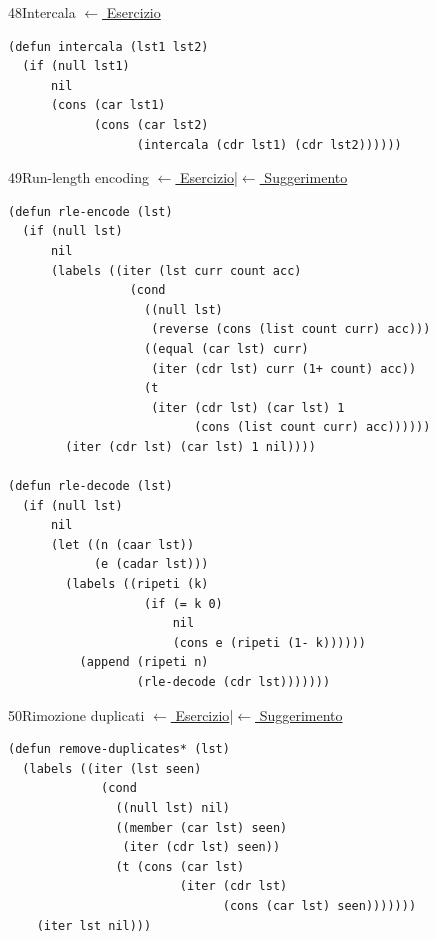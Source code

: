\label{sol:48}
\begin{solbox}{48}{Intercala}
\small\color{black!55}\hyperref[ex:48]{$\leftarrow$ Esercizio}\normalsize\color{black}
\begin{lstlisting}
(defun intercala (lst1 lst2)
  (if (null lst1)
      nil
      (cons (car lst1)
            (cons (car lst2)
                  (intercala (cdr lst1) (cdr lst2))))))
\end{lstlisting}
\end{solbox}

\label{sol:49}
\begin{solbox}{49}{Run-length encoding}
\small\color{black!55}\hyperref[ex:49]{$\leftarrow$ Esercizio}\enspace\textcolor{black!30}{|}\enspace\hyperref[hint:49]{$\leftarrow$ Suggerimento}\normalsize\color{black}
\begin{lstlisting}
(defun rle-encode (lst)
  (if (null lst)
      nil
      (labels ((iter (lst curr count acc)
                 (cond
                   ((null lst)
                    (reverse (cons (list count curr) acc)))
                   ((equal (car lst) curr)
                    (iter (cdr lst) curr (1+ count) acc))
                   (t
                    (iter (cdr lst) (car lst) 1
                          (cons (list count curr) acc))))))
        (iter (cdr lst) (car lst) 1 nil))))

(defun rle-decode (lst)
  (if (null lst)
      nil
      (let ((n (caar lst))
            (e (cadar lst)))
        (labels ((ripeti (k)
                   (if (= k 0)
                       nil
                       (cons e (ripeti (1- k))))))
          (append (ripeti n)
                  (rle-decode (cdr lst)))))))
\end{lstlisting}
\end{solbox}

\label{sol:50}
\begin{solbox}{50}{Rimozione duplicati}
\small\color{black!55}\hyperref[ex:50]{$\leftarrow$ Esercizio}\enspace\textcolor{black!30}{|}\enspace\hyperref[hint:50]{$\leftarrow$ Suggerimento}\normalsize\color{black}
\begin{lstlisting}
(defun remove-duplicates* (lst)
  (labels ((iter (lst seen)
             (cond
               ((null lst) nil)
               ((member (car lst) seen)
                (iter (cdr lst) seen))
               (t (cons (car lst)
                        (iter (cdr lst)
                              (cons (car lst) seen)))))))
    (iter lst nil)))
\end{lstlisting}
\end{solbox}

